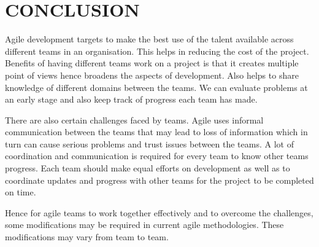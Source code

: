 \documentclass[sigconf]{acmart}
\begin{document}

\section{CONCLUSION}
Agile development targets to make the best use of the talent available across different teams in an organisation. This helps in reducing the cost of the project. Benefits of having different teams work on a project is that it creates multiple point of views hence broadens the aspects of development. Also helps to share knowledge of different domains between the teams. We can evaluate problems at an early stage and also keep track of progress each team has made.

There are also certain challenges faced by teams. Agile uses informal communication between the teams that may lead to loss of information which in turn can cause serious problems and trust issues between the teams. A lot of coordination and communication is required for every team to know other teams progress. Each team should make equal efforts on development as well as to coordinate updates and progress with other teams for the project to be completed on time.

Hence for agile teams to work together effectively and to overcome the challenges, some modifications may be required in current agile methodologies. These modifications may vary from team to team.


%


% 
\appendix

% 
%
\end{document}
